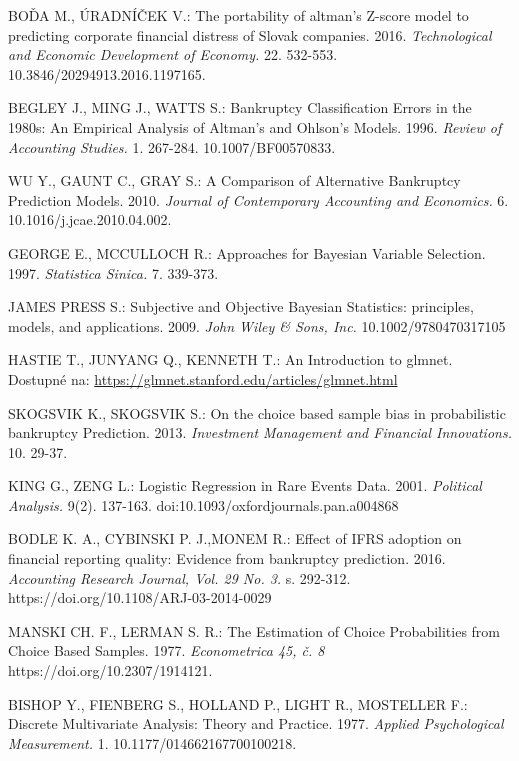 \begin{thebibliography}{99}
     BOĎA M., ÚRADNÍČEK V.: The portability of altman’s Z-score model to predicting corporate financial distress of Slovak companies. 2016.
    \emph{Technological and Economic Development of Economy.} 22. 532-553. 10.3846/20294913.2016.1197165.

     BEGLEY J., MING J., WATTS S.: Bankruptcy Classification Errors in the 1980s: An Empirical Analysis of Altman's and Ohlson's Models.
    1996. \emph{Review of Accounting Studies.} 1. 267-284. 10.1007/BF00570833.

     WU Y., GAUNT C., GRAY S.: A Comparison of Alternative Bankruptcy Prediction Models. 
    2010. \emph{Journal of Contemporary Accounting and Economics.} 6. 10.1016/j.jcae.2010.04.002.

     GEORGE E., MCCULLOCH R.: Approaches for Bayesian Variable Selection. 1997. \emph{Statistica Sinica.} 7. 339-373.

     JAMES PRESS S.: Subjective and Objective Bayesian Statistics: principles, models, and applications. 2009. \emph{John Wiley \& Sons, Inc.} 10.1002/9780470317105

     HASTIE T., JUNYANG Q., KENNETH T.: An Introduction to glmnet. Dostupné na: \url{https://glmnet.stanford.edu/articles/glmnet.html}

     SKOGSVIK K., SKOGSVIK S.: On the choice based sample bias in probabilistic bankruptcy Prediction. 2013.
    \emph{Investment Management and Financial Innovations.} 10. 29-37.

     KING G., ZENG L.: Logistic Regression in Rare Events Data. 2001. \emph{Political Analysis.} 9(2). 137-163. doi:10.1093/oxfordjournals.pan.a004868
    
      BODLE K. A., CYBINSKI P. J.,MONEM R.: Effect of IFRS adoption on financial reporting quality: Evidence from bankruptcy prediction.
    2016. \emph{Accounting Research Journal, Vol. 29 No. 3.} s. 292-312. https://doi.org/10.1108/ARJ-03-2014-0029

     MANSKI CH. F., LERMAN S. R.: The Estimation of Choice Probabilities from Choice Based Samples. 1977. \emph{Econometrica 45, č. 8} https://doi.org/10.2307/1914121.

     BISHOP Y., FIENBERG S., HOLLAND P., LIGHT R., MOSTELLER F.: Discrete Multivariate Analysis: Theory and Practice. 1977. \emph{Applied Psychological Measurement.} 1. 10.1177/014662167700100218.


\end{thebibliography}

